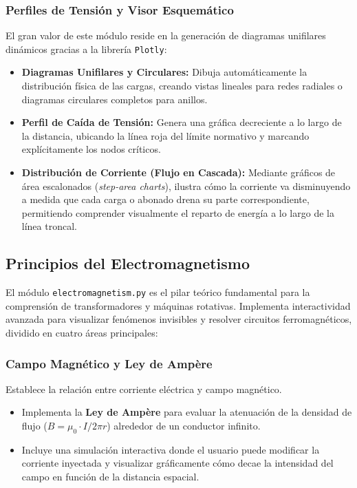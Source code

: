 \documentclass[11pt,a4paper]{article}
\begin{document}
\subsubsection{Perfiles de Tensión y Visor Esquemático}
El gran valor de este módulo reside en la generación de diagramas unifilares dinámicos gracias a la librería \texttt{Plotly}:
\begin{itemize}
    \item \textbf{Diagramas Unifilares y Circulares:} Dibuja automáticamente la distribución física de las cargas, creando vistas lineales para redes radiales o diagramas circulares completos para anillos.
    \item \textbf{Perfil de Caída de Tensión:} Genera una gráfica decreciente a lo largo de la distancia, ubicando la línea roja del límite normativo y marcando explícitamente los nodos críticos.
    \item \textbf{Distribución de Corriente (Flujo en Cascada):} Mediante gráficos de área escalonados (\textit{step-area charts}), ilustra cómo la corriente va disminuyendo a medida que cada carga o abonado drena su parte correspondiente, permitiendo comprender visualmente el reparto de energía a lo largo de la línea troncal.
\end{itemize}

\subsection{Principios del Electromagnetismo}
El módulo \texttt{electromagnetism.py} es el pilar teórico fundamental para la comprensión de transformadores y máquinas rotativas. Implementa interactividad avanzada para visualizar fenómenos invisibles y resolver circuitos ferromagnéticos, dividido en cuatro áreas principales:

\subsubsection{Campo Magnético y Ley de Ampère}
Establece la relación entre corriente eléctrica y campo magnético.
\begin{itemize}
    \item Implementa la \textbf{Ley de Ampère} para evaluar la atenuación de la densidad de flujo ($B = \mu_0 \cdot I / 2\pi r$) alrededor de un conductor infinito.
    \item Incluye una simulación interactiva donde el usuario puede modificar la corriente inyectada y visualizar gráficamente cómo decae la intensidad del campo en función de la distancia espacial.
\end{itemize}
\end{document}
